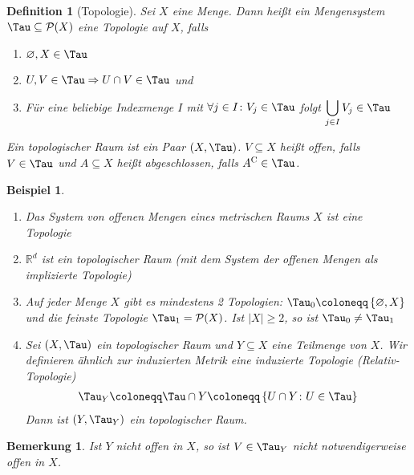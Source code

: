 \documentclass[11pt, twoside, a4paper]{article}
\theoremstyle{plain}
\newtheorem{bemerkung}[blockelement]{Bemerkung}
\newtheorem{definition}[blockelement]{Definition}
\newtheorem{beispiel}[blockelement]{Beispiel}
\numberwithin{equation}{subsection}
\newcommand{\set}[1]{\left\{#1\right\}}
\newcommand{\pair}[1]{\left(#1\right)}
\newcommand{\of}[1]{\mathopen{}\mathclose{}\bgroup\left(#1\aftergroup\egroup\right)}
\newcommand{\abs}[1]{\left\lvert#1\right\rvert}
\newcommand{\impl}[0]{\Rightarrow{}}
\renewcommand{\emptyset}{\varnothing}
\newcommand{\sbset}{\subseteq}
\newcommand{\theoremescape}{\leavevmode}
\newcommand{\R}{\mathbb{R}}
\begin{document}
    \begin{definition}[Topologie]
        Sei $X$ eine Menge. Dann heißt ein Mengensystem $\Tau\sbset\mathcal{P}\of{X}$ eine Topologie auf $X$, falls
        \begin{enumerate}[label=(\roman*)]
            \item $\emptyset, X\in\Tau$
            \item $U, V\in \Tau \impl U \cap V \in \Tau$ und
            \item Für eine beliebige Indexmenge $I$ mit $\forall j\in I\colon V_j \in \Tau$ folgt $\displaystyle\bigcup_{j\in I} V_j \in \Tau$
        \end{enumerate}
        Ein topologischer Raum ist ein Paar $\pair{X, \Tau}$. $V\subseteq X$ heißt offen, falls $V\in\Tau$ und $A\subseteq X$ heißt abgeschlossen, falls $A^{\mathrm{C}} \in\Tau$.
    \end{definition}

    \begin{beispiel}
        \theoremescape
        \begin{enumerate}
            \item Das System von offenen Mengen eines metrischen Raums $X$ ist eine Topologie
            \item $\R^d$ ist ein topologischer Raum (mit dem System der offenen Mengen als implizierte Topologie)
            \item Auf jeder Menge $X$ gibt es mindestens 2 Topologien: $\Tau_0 \coloneqq \set{\emptyset, X}$ und die feinste Topologie $\Tau_1 = \mathcal{P}\of{X}$. Ist $\abs{X} \geq 2$, so ist $\Tau_0 \neq \Tau_1$
            \item Sei $\pair{X, \Tau}$ ein topologischer Raum und $Y\subseteq X$ eine Teilmenge von $X$. Wir definieren ähnlich zur induzierten Metrik eine \emph{induzierte Topologie} (Relativ-Topologie)
            \begin{align*}
                \Tau_{Y} \coloneqq \Tau \cap Y \coloneqq \set{U \cap Y \colon U\in \Tau}
            \end{align*}
            Dann ist $\pair{Y, \Tau_Y}$ ein topologischer Raum.
        \end{enumerate}
    \end{beispiel}

    \begin{bemerkung}
        Ist $Y$ nicht offen in $X$, so ist $V\in \Tau_Y$ nicht notwendigerweise offen in $X$.
    \end{bemerkung}
\end{document}
